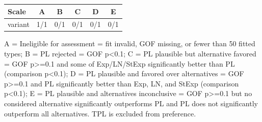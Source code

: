\begin{tabular}{lccccc}
\toprule
Scale & \cellcolor[HTML]{FFFFFF} A & \cellcolor[HTML]{EA4646} B & \cellcolor[HTML]{9670BD} C & \cellcolor[HTML]{8FEB32} D & \cellcolor[HTML]{19C8C8} E \\
\midrule
variant & \cellcolor[HTML]{FFFFFF} 1/1 & \cellcolor[HTML]{EA4646} 0/1 & \cellcolor[HTML]{9670BD} 0/1 & \cellcolor[HTML]{8FEB32} 0/1 & \cellcolor[HTML]{19C8C8} 0/1 \\
\bottomrule
\end{tabular}
\begin{flushleft}\footnotesize A = Ineligible for assessment = fit invalid, GOF missing, or fewer than 50 fitted types; B = PL rejected = GOF p<0.1; C = PL plausible but alternative favored = GOF p>=0.1 and some of Exp/LN/StExp significantly better than PL (comparison p<0.1); D = PL plausible and favored over alternatives = GOF p>=0.1 and PL significantly better than Exp, LN, and StExp (comparison p<0.1); E = PL plausible and alternatives inconclusive = GOF p>=0.1 but no considered alternative significantly outperforms PL and PL does not significantly outperform all alternatives. TPL is excluded from preference.\end{flushleft}
